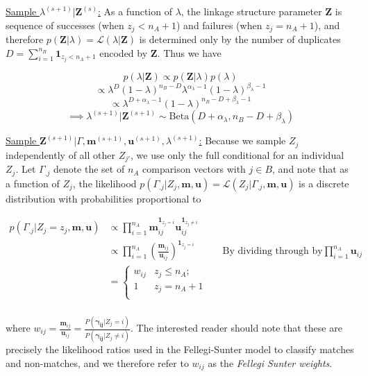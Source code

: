 \documentclass[
  12pt,
]{article}
\begin{document}
\underline{Sample $\lambda^{(s+1)}|\mathbf{Z}^{(s)}$:} As a function of
\(\lambda\), the linkage structure parameter \(\mathbf{Z}\) is sequence
of successes (when \(z_j < n_A + 1\)) and failures (when
\(z_j = n_A + 1\)), and therefore
\(p(\mathbf{Z}|\lambda) = \mathcal{L}(\lambda|\mathbf{Z})\) is
determined only by the number of duplicates
\(D = \sum_{i=1}^{n_B}\mathbf{1}_{z_j < n_A + 1}\) encoded by
\(\mathbf{Z}\). Thus we have

\[p(\lambda | \mathbf{Z}) \propto p(\mathbf{Z}|\lambda)p(\lambda)\]
\[\propto \lambda^D (1-\lambda)^{n_B - D} \lambda^{\alpha_{\lambda} -1} (1-\lambda)^{\beta_{\lambda} -1}\]
\[ \propto \lambda^{D + \alpha_{\lambda} - 1} (1-\lambda)^{n_B - D + \beta_{\lambda} -1}\]
\[\implies \lambda^{(s+1)}|\mathbf{Z}^{(s+1)} \sim \text{Beta}(D + \alpha_{\lambda}, n_B - D + \beta_{\lambda})\]

\underline{Sample $\mathbf{Z}^{(s+1)}|\Gamma, \mathbf{m}^{(s+1)}, \mathbf{u}^{(s+1)}, \lambda^{(s+1)}$:}
Because we sample \(Z_j\) independently of all other \(Z_{j'}\), we use
only the full conditional for an individual \(Z_j\). Let \(\Gamma_{.j}\)
denote the set of \(n_A\) comparison vectors with \(j \in B\), and note
that as a function of \(Z_j\), the likelihood
\(p(\Gamma_{.j}|Z_j, \mathbf{m}, \mathbf{u}) = \mathcal{L}(Z_j|\Gamma_{.j}, \mathbf{m}, \mathbf{u})\)
is a discrete distribution with probabilities proportional to

\begin{align*}
p(\Gamma_{.j}|Z_j = z_j, \mathbf{m}, \mathbf{u}) &\propto \prod_{i=1}^{n_A}\mathbf{m}_{ij}^{\mathbf{1}_{z_j = i}}\mathbf{u}_{ij}^{\mathbf{1}_{z_j \neq i}}\\
&\propto \prod_{i=1}^{n_A}\left(\frac{\mathbf{m}_{ij}}{\mathbf{u}_{ij}}\right)^{\mathbf{1}_{z_j = i}} && \text{By dividing through by} \prod_{i = 1}^{n_A}\mathbf{u}_{ij}\\
&=
\begin{cases} 
    w_{ij}  & z_j \leq n_A; \\
    1 &  z_j  = n_A + 1 \\
\end{cases}\\
\end{align*}

where
\(w_{ij} = \frac{\mathbf{m}_{ij}}{\mathbf{u}_{ij}} = \frac{P(\boldsymbol{\gamma_{ij}}|Z_j = i)}{P(\boldsymbol{\gamma_{ij}} |Z_j \neq i)}\).
The interested reader should note that these are precisely the
likelihood ratios used in the Fellegi-Sunter model to classify matches
and non-matches, and we therefore refer to \(w_{ij}\) as the
\emph{Fellegi Sunter weights}.
\end{document}
